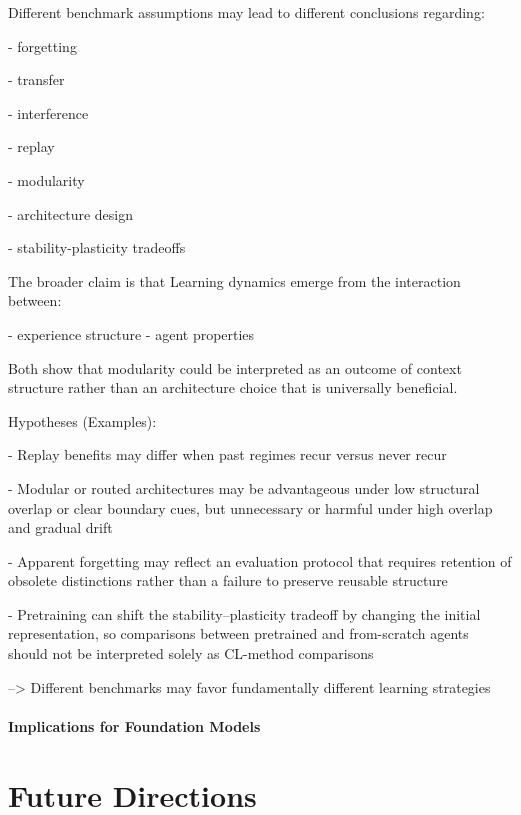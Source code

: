 \documentclass{article}
\begin{document}
        
        
        Different benchmark assumptions may lead to different conclusions regarding:
        
        - forgetting
        
        - transfer
        
        - interference
        
        - replay
        
        - modularity
        
        - architecture design
        
        - stability-plasticity tradeoffs
        
        
        The broader claim is that Learning dynamics emerge from the interaction between:
        
        - experience structure
        - agent properties

        Both \cite{johnston2024modular} show that modularity could be interpreted as an outcome of context structure rather than an architecture choice that is universally beneficial.

        Hypotheses (Examples):

        - Replay benefits may differ when past regimes recur versus never recur
        
        - Modular or routed architectures may be advantageous under low structural overlap or clear boundary cues, but unnecessary or harmful under high overlap and gradual drift

        - Apparent forgetting may reflect an evaluation protocol that requires retention of obsolete distinctions rather than a failure to preserve reusable structure
        
        - Pretraining can shift the stability–plasticity tradeoff by changing the initial representation, so comparisons between pretrained and from-scratch agents should not be interpreted solely as CL-method comparisons

        --> Different benchmarks may favor fundamentally different learning strategies


        \paragraph{Implications for Foundation Models}

        
    \section{Future Directions}
        
\end{document}
